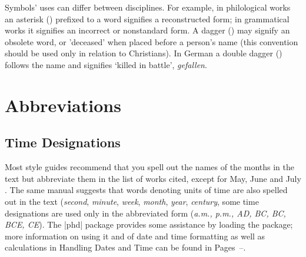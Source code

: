 Symbols' uses can differ between disciplines. For example, in philological
works an asterisk (\textasteriskcentered) prefixed to a word signifies a reconstructed
form; in grammatical works it signifies an incorrect or nonstandard
form. A dagger (\textdagger) may signify an obsolete word, or 'deceased' when
placed before a person's name (this convention should be used only in
relation to Christians). In German a double dagger (\textdaggerdbl) follows the name
and signifies `killed in battle', \textit{gefallen}.

\section{Abbreviations}

\subsection{Time Designations}

Most style guides recommend that you spell out the names of the months in the text but abbreviate them in the list  of works cited, except for May, June and July \cite{MLA}. The same manual suggests that words denoting units of time are also spelled out in the text (\textit{second}, \textit{minute}, \textit{week}, \textit{month}, \textit{year}, \textit{century}, some time designations are used only in the abbreviated form (\textit{a.m., p.m., AD, BC, BC, BCE, CE}). The |phd| package provides some assistance by loading the  package; more information on using it and of date and time formatting as well as calculations in Handling Dates and Time can be found in Pages~\pageref{ch:dates}--\pageref{datesend}.
\medskip

